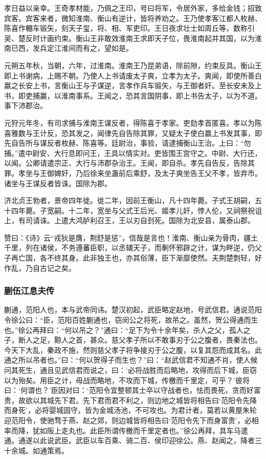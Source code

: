 \documentclass[]{article}
\begin{document}
孝日益以亲幸。王奇孝材能，乃佩之王印，号曰将军，令居外家，多给金钱；招致宾客。宾客来者，微知淮南、衡山有逆计，皆将养劝之。王乃使孝客江都人枚赫、陈喜作輣车锻矢，刻天子玺，将、相、军吏印。王日夜求壮士如周丘等，数称引吴、楚反时计画约束。衡山王非敢效淮南王求即天子位，畏淮南起并其国，以为淮南已西，发兵定江淮间而有之，望如是。

元朔五年秋，当朝，六年，过淮南。淮南王乃昆弟语，除前隙，约束反具。衡山王即上书谢病，上赐不朝。乃使人上书请废太子爽，立孝为太子。爽闻，即使所善白嬴之长安上书，言衡山王与子谋逆，言孝作兵车锻矢，与王御者奸。至长安未及上书，即吏捕赢，以淮南事系。王闻之，恐其言国阴事，即上书告太子，以为不道。事下沛郡治。

元狩元年冬，有司求捕与淮南王谋反者，得陈喜于孝家。吏劾孝首匿喜。孝以为陈喜雅数与王计反，恐其发之，闻律先自告除其罪，又疑太子使白嬴上书发其事，即先自告所与谋反者枚赫、陈喜等。廷尉治，事验，请逮捕衡山王治。上曰：``勿捕。''遣中尉安、大行息即问王，王具以情实对。吏皆围王宫守之。中尉、大行还，以闻。公卿请遣宗正、大行与沛郡杂治王。王闻，即自杀。孝先自告反，告除其罪。孝坐与王御婢奸，乃后徐来坐蛊前后乘舒，及太子爽坐告王父不孝，皆弃市。诸坐与王谋反者皆诛。国除为郡。

济北贞王勃者，景帝四年徙。徙二年，因前王衡山，凡十四年薨。子式王胡嗣，五十四年薨。子宽嗣。十二年，宽坐与父式王后光、姬孝儿奸，悖人伦，又祠祭祝诅上，有司请诛。上遣大鸿胪利召王，王以刃自刭死。国除为北安县，属泰山郡。

赞曰：《诗》云``戎狄是膺，荆舒是惩''，信哉是言也！淮南、衡山亲为骨肉，疆土千里，列在诸侯，不务遵蕃臣职，以丞辅天子，而剸怀邪辟之计，谋为畔逆，仍父子再亡国，各不终其身。此非独王也，亦其俗薄，臣下渐靡使然。夫荆楚剽轻，好作乱，乃自古记之矣。

\hypertarget{header-n3990}{%
\subsubsection{蒯伍江息夫传}\label{header-n3990}}

蒯通，范阳人也，本与武帝同讳。楚汉初起，武臣略定赵地，号武信君。通说范阳令徐公曰：``臣，范阳百姓蒯通也，窃闵公之将死，故吊之。虽然，贺公得通而生也。''徐公再拜曰：``何以吊之？''通曰：``足下为令十余年矣，杀人之父，孤人之子，断人之足，黥人之首，甚众。慈父孝子所以不敢事刃于公之腹者，畏秦法也。今天下大乱，秦政不施，然则慈父孝子将争接刃于公之腹，以复其怨而成其名。此通之所以吊者也。''曰：``何以贺得子而生也？''曰：``赵武信君不知通不肖，使人候问其死生，通且见武信君而说之，曰：`必将战胜而后略地，攻得而后下城，臣窃以为殆矣。用臣之计，毋战而略地，不攻而下城，传檄而千里定，可乎？'彼将曰：`何谓也？'臣因对曰：`范阳令宜整顿其士卒以守战者也，怯而畏死，贪而好富贵，故欲以其城先下君。先下君而君不利之，则边地之城皆将相告曰`范阳令先降而身死'，必将婴城固守，皆为金城汤池，不可攻也。为君计者，莫若以黄屋朱轮迎范阳令，使驰骛于燕、赵之郊，则边城皆将相告曰`范阳令先下而身富贵'，必相率而降，犹如阪上走丸也。此臣所谓传檄而千里定者也。''徐公再拜，具车马遣通。通遂以此说武臣。武臣以车百乘、骑二百、侯印迎徐公。燕、赵闻之，降者三十余城。如通策焉。
\end{document}
